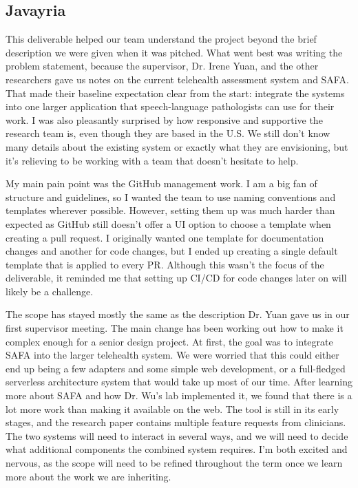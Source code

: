 \documentclass{article}
\begin{document}
\subsection*{Javayria}
This deliverable helped our team understand the project beyond the brief description we were given when it was pitched. What went best was writing the problem statement,
 because the supervisor, Dr. Irene Yuan, and the other researchers gave us notes on the current telehealth assessment system and SAFA. That made their baseline
  expectation clear from the start: integrate the systems into one larger application that speech-language pathologists can use for their work.
I was also pleasantly surprised by how responsive and supportive the research team is, even though they are based in the U.S. We still don't know many
 details about the existing system or exactly what they are envisioning, but it's relieving to be working with a team that doesn't hesitate to help.

My main pain point was the GitHub management work. I am a big fan of structure and guidelines, so I wanted the team to use naming conventions and templates wherever
 possible. However, setting them up was much harder than expected as GitHub still doesn't offer a UI option to choose a template when creating a pull request. I 
 originally wanted one template for documentation changes and another for code changes, but I ended up creating a single default template that is applied to every PR. 
 Although this wasn't the focus of the deliverable, it reminded me that setting up CI/CD for code changes later on will likely be a challenge.

The scope has stayed mostly the same as the description Dr. Yuan gave us in our first supervisor meeting. The main change has been working out how to make it 
 complex enough for a senior design project. At first, the goal was to integrate SAFA into the larger telehealth system. We were worried that this could either end up being a 
 few adapters and some simple web development, or a full-fledged serverless architecture system that would take up most of our time. After learning more about SAFA 
 and how Dr. Wu's lab implemented it, we found that there is a lot more work than making it available on the web. The tool is still in its early stages, and the
  research paper contains multiple feature requests from clinicians. The two systems will need to interact in several ways, and we will need to decide what 
  additional components the combined system requires. I'm both excited and nervous, as the scope will need to be refined throughout the term once we learn more about
  the work we are inheriting.
\end{document}

